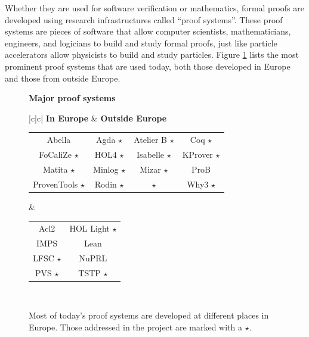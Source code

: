 Whether they are used for software verification or mathematics, formal
proofs are developed using research infrastructures called
``proof systems''.  These proof systems are pieces of software that
allow computer scientists, mathematicians, engineers, and logicians to
build and study formal proofs, just like particle accelerators allow
physicists to build and study particles. Figure \ref{systems} lists
the most prominent proof systems that are used today, both those
developed in Europe and those from outside Europe.

\newcommand\s{ $\star$}
\begin{figure}[ht]
  \begin{shaded}
    \begin{center}
      {\bf \Large Major proof systems}\\[5mm]
      \begin{tabular}{|c|c|}\hline
       {\bf In Europe} & {\bf Outside Europe}\\\hline
        \begin{minipage}{10cm}
          \begin{tabular}{cccc}
            Abella & Agda\s & Atelier B\s & Coq\s\\
            FoCaliZe\s & HOL4\s & Isabelle\s & KProver\s\\
            Matita\s & Minlog\s & Mizar\s & ProB\\
            ProvenTools\s & Rodin\s & \tlaplus\s & Why3\s\\
          \end{tabular}
        \end{minipage}
        &\begin{minipage}{4cm}
           \begin{tabular}{cc}
             Acl2 & HOL Light\s\\
             IMPS & Lean\\
             LFSC\s & NuPRL\\
             PVS\s & TSTP\s
           \end{tabular}
         \end{minipage}\\\hline
      \end{tabular}
    \end{center}
    \vspace{-5mm}
    \caption{Most of today's proof systems are developed at different
      places in Europe. Those addressed in the project are marked with
      a $\star$.\label{systems}}
  \end{shaded}
\end{figure}

